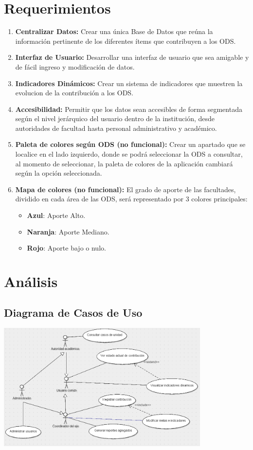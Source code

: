\documentclass[12pt]{article}
\begin{document}
\section{Requerimientos}
\begin{enumerate}
    \item{\textbf{Centralizar Datos:} Crear una única Base de Datos que reúna la información pertinente de los diferentes ítems que contribuyen a los ODS.}
    \item{\textbf{Interfaz de Usuario:} Desarrollar una interfaz de usuario que sea amigable y de fácil ingreso y modificación de datos.}
    \item{\textbf{Indicadores Dinámicos:} Crear un sistema de indicadores que muestren la evolucion de la contribución a los ODS.}
    \item{\textbf{Accesibilidad:} Permitir que los datos sean accesibles de forma segmentada según el nivel jerárquico del usuario dentro de la institución, desde autoridades de facultad hasta personal administrativo y académico.}
    \item{\textbf{Paleta de colores según ODS (no funcional):} Crear un apartado que se localice en el lado izquierdo, donde se podrá seleccionar la ODS a consultar, al momento de seleccionar, la paleta de colores de la aplicación cambiará según la opción seleccionada.}
    \item{\textbf{Mapa de colores (no funcional):} El grado de aporte de las facultades, dividido en cada área de las ODS, será representado por 3 colores principales:
      \begin{itemize}
        \item{{\color{blue}  \textbf{Azul}}: Aporte Alto.}
        \item{{\color{orange}\textbf{Naranja}}: Aporte Mediano.}
        \item{{\color{red}   \textbf{Rojo}}: Aporte bajo o nulo.}
      \end{itemize}}
\end{enumerate}
\clearpage

\section{Análisis}
\subsection{Diagrama de Casos de Uso}
\begin{center}
    \includegraphics[width=0.8\textwidth]{image.png}
\end{center}
\end{document}
